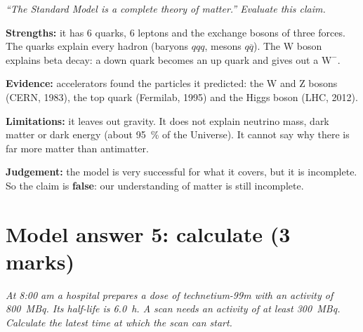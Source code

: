 \emph{``The Standard Model is a complete theory of matter.'' Evaluate this claim.}

\begin{modelanswer}
 \textbf{Strengths:} it has 6 quarks, 6 leptons and the exchange bosons of three
forces. The quarks explain every hadron (baryons $qqq$, mesons $q\overline{q}$). The
W boson explains beta decay: a down quark becomes an up quark and gives out a
$\mathrm{W}^-$.

 \textbf{Evidence:} accelerators found the particles it predicted: the W and Z
bosons (CERN, 1983), the top quark (Fermilab, 1995) and the Higgs boson (LHC, 2012).
\tcbbreak %

 \textbf{Limitations:} it leaves out gravity. It does not explain neutrino mass,
dark matter or dark energy (about \qty{95}{\percent} of the Universe). It cannot say why
there is far more matter than antimatter.

 \textbf{Judgement:} the model is very successful for what it covers, but it is
incomplete. So the claim is \textbf{false}: our understanding of matter is still
incomplete.
\end{modelanswer}

\begin{markingcriteria}
\end{markingcriteria}
\enlargethispage{\baselineskip}

\section*{Model answer 5: calculate (3 marks)}

\emph{At 8:00 am a hospital prepares a dose of technetium-99m with an activity of
\qty{800}{MBq}. Its half-life is \qty{6.0}{h}. A scan needs an activity of at least
\qty{300}{MBq}. Calculate the latest time at which the scan can start.}

